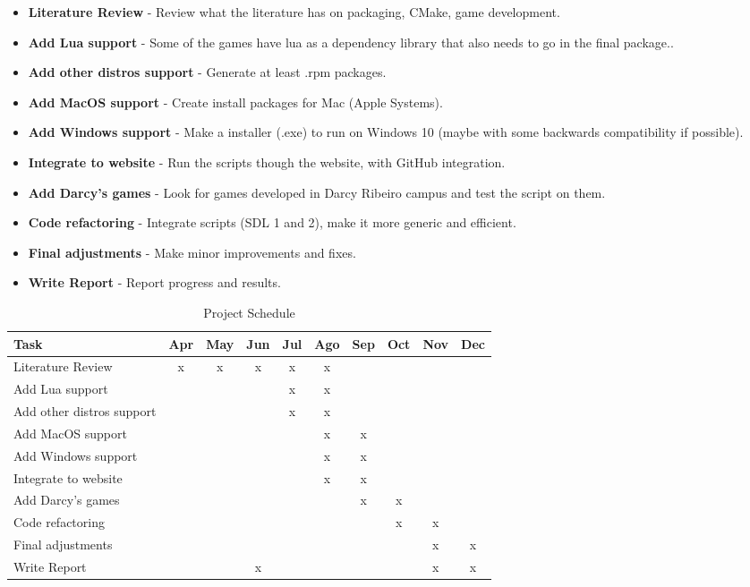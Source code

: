 \begin{itemize}
\item \textbf{Literature Review} - Review what the literature has on packaging, CMake, game development.
\item \textbf{Add Lua support} - Some of the games have lua as a dependency library that also needs to go in the final package..
\item \textbf{Add other distros support} - Generate at least .rpm packages.
\item \textbf{Add MacOS support} - Create install packages for Mac (Apple Systems).
\item \textbf{Add Windows support} - Make a installer (.exe) to run on Windows 10 (maybe with some backwards compatibility if possible).
\item \textbf{Integrate to website} - Run the scripts though the website, with GitHub integration.
\item \textbf{Add Darcy's games} - Look for games developed in Darcy Ribeiro campus and test the script on them.
\item \textbf{Code refactoring} - Integrate scripts (SDL 1 and 2), make it more generic and efficient.
\item \textbf{Final adjustments} - Make minor improvements and fixes.
\item \textbf{Write Report} - Report progress and results.
\end{itemize}

\begin{table}[h!]
\centering
\caption{Project Schedule}
\label{tab:schedule}
\begin{tabular}{|l|c|c|c|c|c|c|c|c|c|}
\hline
\textbf{Task} & \multicolumn{1}{l|}{\textbf{Apr}} & \multicolumn{1}{l|}{\textbf{May}} & \multicolumn{1}{l|}{\textbf{Jun}} & \multicolumn{1}{l|}{\textbf{Jul}} & \multicolumn{1}{l|}{\textbf{Ago}} & \multicolumn{1}{l|}{\textbf{Sep}} & \multicolumn{1}{l|}{\textbf{Oct}} & \multicolumn{1}{l|}{\textbf{Nov}} & \multicolumn{1}{l|}{\textbf{Dec}} \\ \hline
Literature Review & x & x & x & x & x &  &  &  &  \\ \hline
Add Lua support &  &  &  & x & x &  &  &  &  \\ \hline
Add other distros support &  &  &  & x & x &  &  &  &  \\ \hline
Add MacOS support &  &  &  &  & x & x &  &  &  \\ \hline
Add Windows support &  &  &  &  & x & x &  &  &  \\ \hline
Integrate to website &  &  &  &  & x & x &  &  &  \\ \hline
Add Darcy's games &  &  &  &  &  & x & x &  &  \\ \hline
Code refactoring &  &  &  &  &  &  & x & x &  \\ \hline
Final adjustments &  &  &  &  &  &  &  & x & x \\ \hline
Write Report &  &  & x &  &  &  &  & x & x \\ \hline
\end{tabular}
\end{table}
